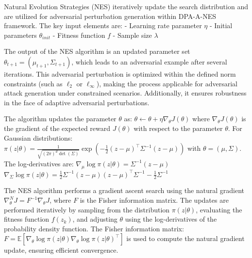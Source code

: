 
Natural Evolution Strategies (NES) iteratively update the search distribution and are utilized for adversarial perturbation generation within DPA-A-NES framework. The key input elements are:
- Learning rate parameter $\eta$
- Initial parameters $\theta_{init}$
- Fitness function $f$
- Sample size $\lambda$

The output of the NES algorithm is an updated parameter set $\theta_{t+1} = (\mu_{t+1}, \Sigma_{t+1})$, which leads to an adversarial example after several iterations. This adversarial perturbation is optimized within the defined norm constraints (such as $\ell_2$ or $\ell_\infty$), making the process applicable for adversarial attack generation under constrained scenarios. Additionally, it ensures robustness in the face of adaptive adversarial perturbations.

The algorithm updates the parameter $\theta$ as:
$\theta \leftarrow \theta + \eta \nabla_\theta J(\theta)$
where $\nabla_\theta J(\theta)$ is the gradient of the expected reward $J(\theta)$ with respect to the parameter $\theta$. For Gaussian distributions:
$\pi(z | \theta) = \frac{1}{\sqrt{(2\pi)^d \det(\Sigma)}} \exp \left( -\frac{1}{2} (z - \mu)^\top \Sigma^{-1} (z - \mu) \right)$
with $\theta = (\mu, \Sigma)$. The log-derivatives are:
$\nabla_\mu \log \pi (z | \theta) = \Sigma^{-1} (z - \mu)$
$\nabla_\Sigma \log \pi (z | \theta) = \frac{1}{2} \Sigma^{-1} (z - \mu) (z - \mu)^\top \Sigma^{-1} - \frac{1}{2} \Sigma^{-1}$

The NES algorithm performs a gradient ascent search using the natural gradient $\nabla_\theta^N J = F^{-1} \nabla_\theta J$, where $F$ is the Fisher information matrix. The updates are performed iteratively by sampling from the distribution $\pi(z|\theta)$, evaluating the fitness function $f(z_k)$, and adjusting $\theta$ using the log-derivatives of the probability density function. The Fisher information matrix:
$F = \mathbb{E} \left[ \nabla_\theta \log \pi (z|\theta) \nabla_\theta \log \pi (z|\theta)^\top \right]$
is used to compute the natural gradient update, ensuring efficient convergence.